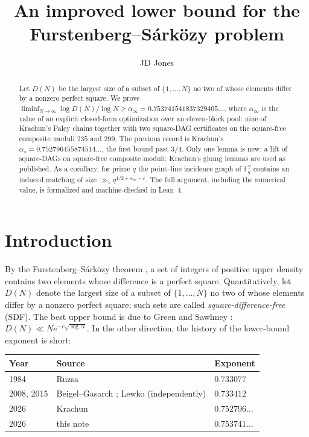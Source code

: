 \documentclass[11pt]{amsart}
\title{An improved lower bound for the Furstenberg--S\'ark\"ozy problem}
\author{JD Jones}
\theoremstyle{plain}
\theoremstyle{remark}
\newcommand{\F}{\mathbb{F}}
\begin{document}
\begin{abstract}
Let $D(N)$ be the largest size of a subset of $\{1,\dots,N\}$ no two of whose
elements differ by a nonzero perfect square. We prove
$\liminf_{N\to\infty} \log D(N)/\log N \ge \alpha_\infty
 = 0.753741541837329405\dots$,
where $\alpha_\infty$ is the value of an explicit closed-form optimization over
an eleven-block pool: nine of Krachun's Paley chains together with two
square-DAG certificates on the square-free composite moduli $235$ and $299$.
The previous record is Krachun's $\alpha_\star = 0.752796455874514\dots$, the
first bound past $3/4$. Only one lemma is new: a lift of square-DAGs on
square-free composite moduli; Krachun's gluing lemmas are used as published.
As a corollary, for prime $q$ the point--line incidence graph of $\F_q^2$
contains an induced matching of size $\gg_\varepsilon q^{1/2+\alpha_\infty-\varepsilon}$.
The full argument, including the numerical value, is formalized and
machine-checked in Lean~4.
\end{abstract}

\maketitle

\section{Introduction}

By the Furstenberg--S\'ark\"ozy theorem \cite{Furstenberg,Sarkozy}, a set of
integers of positive upper density contains two elements whose difference is a
perfect square. Quantitatively, let $D(N)$ denote the largest size of a subset
of $\{1,\dots,N\}$ no two of whose elements differ by a nonzero perfect
square; such sets are called \emph{square-difference-free} (SDF). The best
upper bound is due to Green and Sawhney \cite{GreenSawhney}:
$D(N) \ll N e^{-c\sqrt{\log N}}$. In the other direction, the history of the
lower-bound exponent is short:

\begin{center}
\begin{tabular}{lll}
\toprule
Year & Source & Exponent \\
\midrule
1984 & Ruzsa \cite{Ruzsa} & $0.733077$ \\
2008, 2015 & Beigel--Gasarch \cite{BeigelGasarch}; Lewko \cite{Lewko} (independently) & $0.733412$ \\
2026 & Krachun \cite{Krachun} & $0.752796\dots$ \\
2026 & this note & $0.753741\dots$ \\
\bottomrule
\end{tabular}
\end{center}
\end{document}
